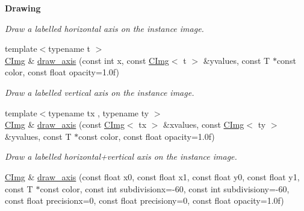 \begin{Indent}{\bf Drawing}
\begin{DoxyCompactItemize}
\begin{DoxyCompactList}\small\item\em Draw a labelled horizontal axis on the instance image. \item\end{DoxyCompactList}\item 
\hypertarget{structcimg__library_1_1_c_img_a6afeecfad99113c3091ca3ff23e85876}{
{\footnotesize template$<$typename t $>$ }\\\hyperlink{structcimg__library_1_1_c_img}{CImg} \& \hyperlink{structcimg__library_1_1_c_img_a6afeecfad99113c3091ca3ff23e85876}{draw\_\-axis} (const int x, const \hyperlink{structcimg__library_1_1_c_img}{CImg}$<$ t $>$ \&yvalues, const T $\ast$const color, const float opacity=1.0f)}
\label{structcimg__library_1_1_c_img_a6afeecfad99113c3091ca3ff23e85876}

\begin{DoxyCompactList}\small\item\em Draw a labelled vertical axis on the instance image. \item\end{DoxyCompactList}\item 
\hypertarget{structcimg__library_1_1_c_img_aa41421a441f823f61f1a13a10f39451b}{
{\footnotesize template$<$typename tx , typename ty $>$ }\\\hyperlink{structcimg__library_1_1_c_img}{CImg} \& \hyperlink{structcimg__library_1_1_c_img_aa41421a441f823f61f1a13a10f39451b}{draw\_\-axis} (const \hyperlink{structcimg__library_1_1_c_img}{CImg}$<$ tx $>$ \&xvalues, const \hyperlink{structcimg__library_1_1_c_img}{CImg}$<$ ty $>$ \&yvalues, const T $\ast$const color, const float opacity=1.0f)}
\label{structcimg__library_1_1_c_img_aa41421a441f823f61f1a13a10f39451b}

\begin{DoxyCompactList}\small\item\em Draw a labelled horizontal+vertical axis on the instance image. \item\end{DoxyCompactList}\item 
\hypertarget{structcimg__library_1_1_c_img_a0286b440e4200818656be205cd38838a}{
\hyperlink{structcimg__library_1_1_c_img}{CImg} \& \hyperlink{structcimg__library_1_1_c_img_a0286b440e4200818656be205cd38838a}{draw\_\-axis} (const float x0, const float x1, const float y0, const float y1, const T $\ast$const color, const int subdivisionx=-\/60, const int subdivisiony=-\/60, const float precisionx=0, const float precisiony=0, const float opacity=1.0f)}
\label{structcimg__library_1_1_c_img_a0286b440e4200818656be205cd38838a}


\end{DoxyCompactItemize}
\end{Indent}
